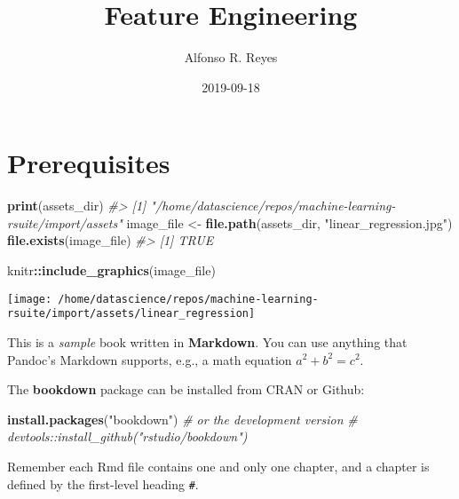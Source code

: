 \documentclass[]{book}
\title{Feature Engineering}
\author{Alfonso R. Reyes}
\date{2019-09-18}
\newenvironment{Shaded}{\begin{snugshade}}{\end{snugshade}}
\newcommand{\CommentTok}[1]{\textcolor[rgb]{0.56,0.35,0.01}{\textit{#1}}}
\newcommand{\KeywordTok}[1]{\textcolor[rgb]{0.13,0.29,0.53}{\textbf{#1}}}
\newcommand{\NormalTok}[1]{#1}
\newcommand{\OperatorTok}[1]{\textcolor[rgb]{0.81,0.36,0.00}{\textbf{#1}}}
\newcommand{\StringTok}[1]{\textcolor[rgb]{0.31,0.60,0.02}{#1}}
\begin{document}
\maketitle

{
\setcounter{tocdepth}{1}
\tableofcontents
}
\hypertarget{prerequisites}{%
\chapter*{Prerequisites}\label{prerequisites}}

\begin{Shaded}
\begin{Highlighting}[]
\KeywordTok{print}\NormalTok{(assets_dir)}
\CommentTok{#> [1] "/home/datascience/repos/machine-learning-rsuite/import/assets"}
\NormalTok{image_file <-}\StringTok{ }\KeywordTok{file.path}\NormalTok{(assets_dir, }\StringTok{"linear_regression.jpg"}\NormalTok{)}
\KeywordTok{file.exists}\NormalTok{(image_file)}
\CommentTok{#> [1] TRUE}
\end{Highlighting}
\end{Shaded}

\begin{Shaded}
\begin{Highlighting}[]
\NormalTok{knitr}\OperatorTok{::}\KeywordTok{include_graphics}\NormalTok{(image_file)}
\end{Highlighting}
\end{Shaded}

\begin{center}\texttt{[image: /home/datascience/repos/machine-learning-rsuite/import/assets/linear\_regression]} \end{center}

This is a \emph{sample} book written in \textbf{Markdown}. You can use anything that Pandoc's Markdown supports, e.g., a math equation \(a^2 + b^2 = c^2\).

The \textbf{bookdown} package can be installed from CRAN or Github:

\begin{Shaded}
\begin{Highlighting}[]
\KeywordTok{install.packages}\NormalTok{(}\StringTok{"bookdown"}\NormalTok{)}
\CommentTok{# or the development version}
\CommentTok{# devtools::install_github("rstudio/bookdown")}
\end{Highlighting}
\end{Shaded}

Remember each Rmd file contains one and only one chapter, and a chapter is defined by the first-level heading \texttt{\#}.
\end{document}
